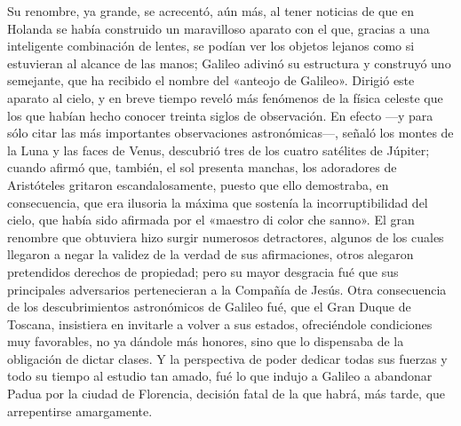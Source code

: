 \documentclass[a4paper, 12pt, draft]{article}
\begin{document}
{Su renombre, ya grande, se acrecentó, aún más, al tener noticias de que en Holanda se había construido un maravilloso aparato con el que, gracias a una inteligente combinación de lentes, se podían ver los objetos lejanos como si estuvieran al alcance de las manos; Galileo adivinó su estructura y construyó uno semejante, que ha recibido el nombre del «anteojo de Galileo». Dirigió este aparato al cielo, y en breve tiempo reveló más fenómenos de la física celeste que los que habían hecho conocer treinta siglos de observación. En efecto ---y para sólo citar las más importantes observaciones astronómicas---, señaló los montes de la Luna y las faces de Venus, descubrió tres de los cuatro satélites de Júpiter; cuando afirmó que, también, el sol presenta manchas, los adoradores de Aristóteles gritaron escandalosamente, puesto que ello demostraba, en consecuencia, que era ilusoria la máxima que sostenía la incorruptibilidad del cielo, que había sido afirmada por el «maestro di color che sanno». El gran renombre que obtuviera hizo surgir numerosos detractores, algunos de los cuales llegaron a negar la validez de la verdad de sus afirmaciones, otros alegaron pretendidos derechos de propiedad; pero su mayor desgracia fué que sus principales adversarios pertenecieran a la Compañía de Jesús. Otra consecuencia de los descubrimientos astronómicos de Galileo fué, que el Gran Duque de Toscana, insistiera en invitarle a volver a sus estados, ofreciéndole condiciones muy favorables, no ya dándole más honores, sino que lo dispensaba de la obligación de dictar clases. Y la perspectiva de poder dedicar todas sus fuerzas y todo su tiempo al estudio tan amado, fué lo que indujo a Galileo a abandonar Padua por la ciudad de Florencia, decisión fatal de la que habrá, más tarde, que arrepentirse amargamente.

}
\end{document}
